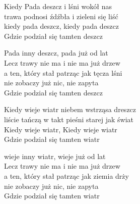 
\begin{text}
    Kiedy Pada deszcz i lśni wokół nas\\
    trawa podnosi źdźbła i zieleni się liść\\
    kiedy pada deszcz, kiedy pada deszcz\\
    Gdzie podział się tamten deszcz

    Pada inny deszcz, pada już od lat\\
    Lecz trawy nie ma i nie ma już drzew\\
    a ten, który stał patrząc jak tęcza lśni\\
    nie zobaczy już nic, nie zapyta\\
    Gdzie podział się tamten deszcz

    Kiedy wieje wiatr niebem wstrząsa dreszcz\\
    liście tańczą w takt pieśni starej jak świat\\
    Kiedy wieje wiatr, Kiedy wieje wiatr\\
    Gdzie podział się tamten wiatr

    wieje inny wiatr, wieje już od lat\\
    Lecz trawy nie ma i nie ma już drzew\\
    a ten, który stał patrząc jak ziemia drży\\
    nie zobaczy już nic, nie zapyta\\
    Gdzie podział się tamten wiatr
\end{text}
\begin{chord}

\end{chord}